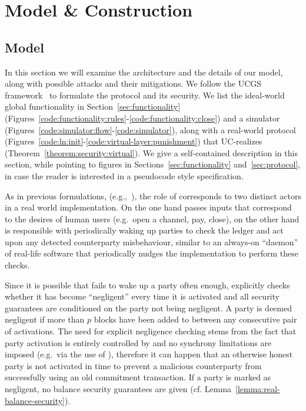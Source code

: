 \section{Model \& Construction}
  \subsection{Model}
  In this section we will examine the architecture and the details of our model,
  along with possible attacks and their mitigations. We follow the UCGS
  framework~\cite{DBLP:conf/tcc/BadertscherCHTZ20} to formulate the protocol and
  its security. We list the
  ideal-world global functionality \fchan in Section~\ref{sec:functionality}
  (Figures~\ref{code:functionality:rules}-\ref{code:functionality:close}) and a
  simulator \simulator (Figures~\ref{code:simulator:flow}-\ref{code:simulator}),
  along with a real-world protocol \pchan
  (Figures~\ref{code:ln:init}-\ref{code:virtual-layer:punishment}) that
  UC-realizes \fchan (Theorem~\ref{theorem:security:virtual}). We give a
  self-contained description in this section, while pointing to figures in
  Sections~\ref{sec:functionality} and~\ref{sec:protocol}, in case the reader is
  interested in a pseudocode style specification.

  As in previous formulations, (e.g.,~\cite{DBLP:conf/csfw/KiayiasL20}), the
  role of \environment corresponds to two distinct actors in a real world
  implementation. On the one hand \environment passes inputs that correspond to
  the desires of human users (e.g.\ open a channel, pay, close), on the other hand
  \environment is responsible with periodically waking up parties to check the
  ledger and act upon any detected counterparty misbehaviour, similar to an
  always-on ``daemon'' of real-life software that periodically nudges the
  implementation to perform these checks.

  Since it is possible that \environment fails to wake up a party often enough,
  \pchan explicitly checks whether it has become ``negligent'' every time it is
  activated and all security guarantees are conditioned on the party not being
  negligent. A party is deemed negligent if more than $p$ blocks have been added
  to \ledger between any consecutive pair of activations. The need for explicit
  negligence checking stems from the fact that party activation is entirely
  controlled by \environment and no synchrony limitations are imposed (e.g.\ via
  the use of \Fclock), therefore it can happen that an otherwise honest party is
  not activated in time to prevent a malicious counterparty from successfully
  using an old commitment transaction. If a party is marked as negligent, no
  balance security guarantees are given (cf.
  Lemma~\ref{lemma:real-balance-security}).

